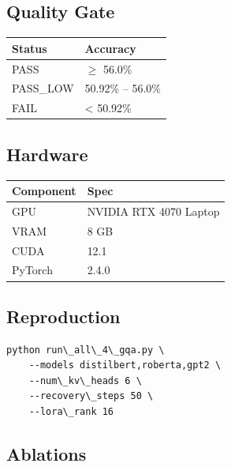 \subsection{Quality Gate}

\begin{table}[H]
\centering
\small
\begin{tabular}{ll}
\toprule
\textbf{Status} & \textbf{Accuracy} \\
\midrule
PASS & $\ge$ 56.0\% \\
PASS\_LOW & 50.92\% -- 56.0\% \\
FAIL & \textless{} 50.92\% \\
\bottomrule
\end{tabular}
\end{table}

\subsection{Hardware}

\begin{table}[H]
\centering
\small
\begin{tabular}{ll}
\toprule
\textbf{Component} & \textbf{Spec} \\
\midrule
GPU & NVIDIA RTX 4070 Laptop \\
VRAM & 8 GB \\
CUDA & 12.1 \\
PyTorch & 2.4.0 \\
\bottomrule
\end{tabular}
\end{table}

\subsection{Reproduction}

\begin{lstlisting}
python run\_all\_4\_gqa.py \
    --models distilbert,roberta,gpt2 \
    --num\_kv\_heads 6 \
    --recovery\_steps 50 \
    --lora\_rank 16
\end{lstlisting}

\subsection{Ablations}
